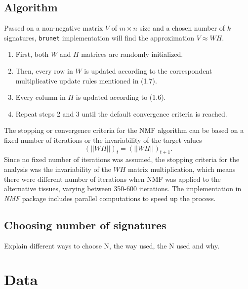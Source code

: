 \subsection{Algorithm}

Passed on a non-negative matrix \(V\) of \(m \times n\) size and a chosen number of \(k\) signatures, \texttt{brunet} implementation will find the approximation \(V \approx WH\).

\begin{enumerate}
    \item First, both \(W\) and \(H\) matrices are randomly initialized.
    \item Then, every row in \(W\) is updated according to the correspondent multiplicative update rules mentioned in (1.7).
    \item Every column in \(H\) is updated according to (1.6).
    \item Repeat steps 2 and 3 until the default convergence criteria is reached.
\end{enumerate}

The stopping or convergence criteria for the NMF algorithm can be based on a fixed number of iterations or the invariability of the target values \[( \vert \vert WH \vert \vert  )_t = ( \vert \vert WH \vert \vert  )_{t+1}.\] Since no fixed number of iterations was assumed, the stopping criteria for the analysis was the invariability of the \(WH\) matrix multiplication, which means there were different number of iterations when NMF was applied to the alternative tissues, varying between 350-600 iterations. The implementation in \textit{NMF} package includes parallel computations to speed up the process.


\subsection{Choosing number of signatures}

Explain different ways to choose N, the way used, the N used and why.


\section{Data}

